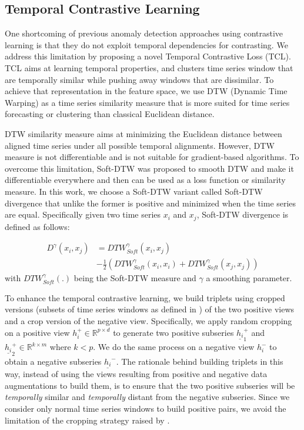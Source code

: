 \subsection{Temporal Contrastive Learning}
One shortcoming of previous anomaly detection approaches using contrastive learning is that they do not exploit temporal dependencies for contrasting. We address this limitation by proposing a novel Temporal Contrastive Loss (TCL). TCL aims at learning temporal properties, and clusters time series window that are temporally similar while pushing away windows that are dissimilar. To achieve that representation in the feature space, we use DTW (Dynamic Time Warping) \cite{sakoe1971dynamic} as a time series similarity measure that is more suited for time series forecasting or clustering than classical Euclidean distance.

DTW similarity measure aims at minimizing the Euclidean distance between aligned time series under all possible temporal alignments. However, DTW measure is not differentiable and is not suitable for gradient-based algorithms. To overcome this limitation, Soft-DTW \cite{Cuturi2017SoftDTWAD} was proposed to smooth DTW and make it differentiable everywhere and then can be used as a loss function or similarity measure. In this work, we choose a Soft-DTW variant called Soft-DTW divergence \cite{blondel2021differentiable}  that unlike the former is positive and minimized when the time series are equal. Specifically given two time series $x_i$ and $x_j$, Soft-DTW divergence is defined as follows:

\begin{equation}\label{soft_dtw_div}
\begin{split}
    D^{\gamma}(x_i, x_j) &= DTW_{Soft}^{\gamma}(x_i, x_j)  \\ 
    &- \frac{1}{2} (DTW_{Soft}^{\gamma}(x_i, x_i) + DTW_{Soft}^{\gamma}(x_j, x_j))
\end{split}
\end{equation}
with $DTW_{Soft}^{\gamma}(.)$ being the Soft-DTW measure and $\gamma$ a smoothing parameter.

To enhance the temporal contrastive learning, we build triplets using cropped versions (subsets of time series windows as defined in \cite{Yue2021TS2VecTU}) of the two positive views and a crop version of the negative view. Specifically, we apply random cropping on a positive view $h_i^+ \in \mathbb{R}^{p \times d}$ to generate two positive subseries $\underline{h_i}_1^+$ and $\underline{h_i}_2^+ \in \mathbb{R}^{k \times m}$ where $k < p$. We do the same process on a negative view $h_i^-$ to obtain a negative subseries $\underline{h_i}^-$.  The rationale behind building triplets in this way, instead of using the views resulting from positive and negative data augmentations to build them, is to ensure that the two positive subseries will be \textit{temporally} similar and \textit{temporally} distant from the negative subseries. Since we consider only normal time series windows to build positive pairs, we avoid the limitation of the cropping strategy raised by \cite{Yue2021TS2VecTU}.

